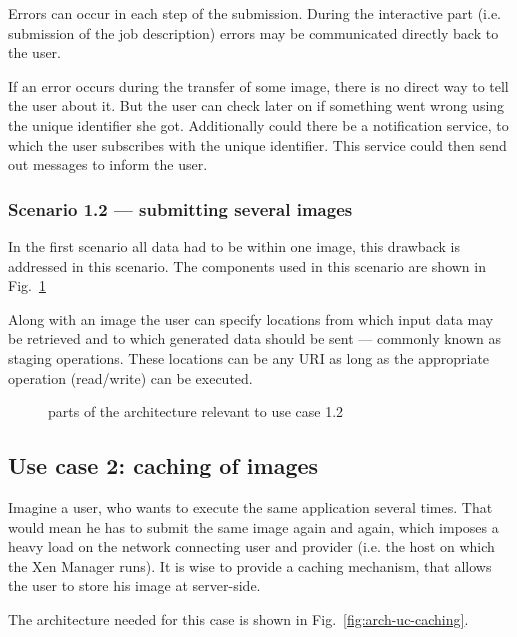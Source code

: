 Errors can occur  in each step of the  submission.  During the interactive
part (i.e. submission  of the job description) errors  may be communicated
directly back to the user.

If an error  occurs during the transfer of some image,  there is no direct
way  to tell  the user  about it.   But  the user  can check  later on  if
something went  wrong using the  unique identifier she  got.  Additionally
could there be  a notification service, to which  the user subscribes with
the unique identifier. This service could then send out messages to inform
the user.

\subsubsection{Scenario 1.2 --- submitting several images}

In the first  scenario all data had to be within  one image, this drawback
is addressed in this scenario. The components used in this scenario are
shown in Fig.~\ref{fig:arch-uc-1.2}

Along with an  image the user can specify locations  from which input data
may be retrieved  and to which generated data should  be sent --- commonly
known as staging operations. These locations can be any URI as long as the
appropriate operation (read/write) can be executed.

\begin{figure}[htbp]
  \begin{center}
  \end{center}
  \caption[Architecture UC 1.2]{parts of the architecture relevant to use
    case 1.2}
  \label{fig:arch-uc-1.2}
\end{figure}

\subsection{Use case 2: caching of images}
\label{uc:2}

Imagine a user,  who wants to execute the same  application several times. 
That would  mean he has  to submit the  same image again and  again, which
imposes a heavy load on the network connecting user and provider (i.e. the
host  on which the  Xen Manager  runs). It  is wise  to provide  a caching
mechanism, that allows the user to store his image at server-side.

The    architecture    needed    for     this    case    is    shown    in
Fig.~\ref{fig:arch-uc-caching}.

